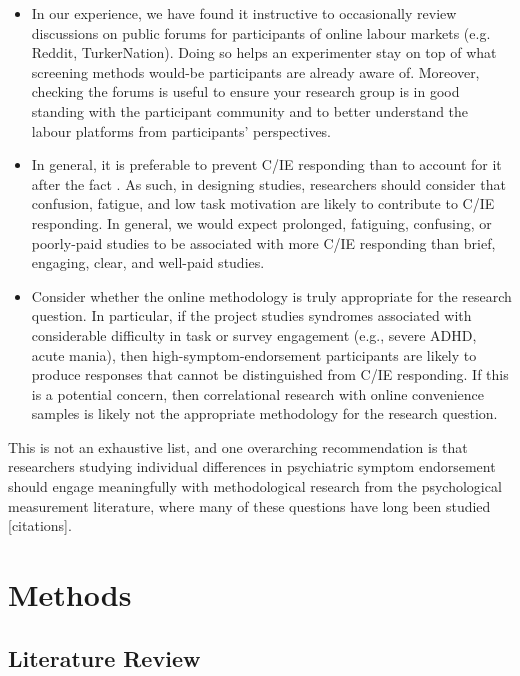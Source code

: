 \documentclass[a4paper,notitlepage,12pt]{article}
\begin{document}
\begin{itemize}
    \item In our experience, we have found it instructive to occasionally review discussions on public forums for participants of online labour markets (e.g. Reddit, TurkerNation). Doing so helps an experimenter stay on top of what screening methods would-be participants are already aware of. Moreover, checking the forums is useful to ensure your research group is in good standing with the participant community and to better understand the labour platforms from participants' perspectives. 
    
    \item In general, it is preferable to prevent C/IE responding than to account for it after the fact \cite{ward2018applying}. As such, in designing studies, researchers should consider that confusion, fatigue, and low task motivation are likely to contribute to C/IE responding. In general, we would expect prolonged, fatiguing, confusing, or poorly-paid studies to be associated with more C/IE responding than brief, engaging, clear, and well-paid studies.
    
    \item Consider whether the online methodology is truly appropriate for the research question. In particular, if the project studies syndromes associated with considerable difficulty in task or survey engagement (e.g., severe ADHD, acute mania), then high-symptom-endorsement participants are likely to produce responses that cannot be distinguished from C/IE responding. If this is a potential concern, then correlational research with online convenience samples is likely not the appropriate methodology for the research question.

\end{itemize}

This is not an exhaustive list, and one overarching recommendation is that researchers studying individual differences in psychiatric symptom endorsement should engage meaningfully with methodological research from the psychological measurement literature, where many of these questions have long been studied [citations].

\newpage

\section{Methods}

\subsection{Literature Review}
\end{document}
